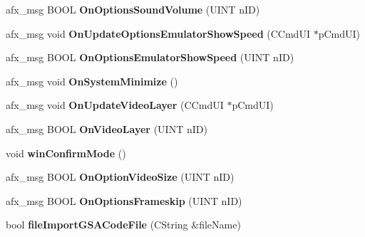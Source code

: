\begin{DoxyCompactItemize}
\item 
\mbox{\label{class_main_wnd_ae784df9d960de0aed023ebfdd444e979}} 
afx\+\_\+msg B\+O\+OL {\bfseries On\+Options\+Sound\+Volume} (U\+I\+NT n\+ID)
\item 
\mbox{\label{class_main_wnd_accdf36d9ca8700e9e49ecd1432de6c11}} 
afx\+\_\+msg void {\bfseries On\+Update\+Options\+Emulator\+Show\+Speed} (C\+Cmd\+UI $\ast$p\+Cmd\+UI)
\item 
\mbox{\label{class_main_wnd_a5f538c28cfe7007a8dd651215f6e4768}} 
afx\+\_\+msg B\+O\+OL {\bfseries On\+Options\+Emulator\+Show\+Speed} (U\+I\+NT n\+ID)
\item 
\mbox{\label{class_main_wnd_a0fe0ca31c45bc8041267a67eabb9f28e}} 
afx\+\_\+msg void {\bfseries On\+System\+Minimize} ()
\item 
\mbox{\label{class_main_wnd_a559482a80b53127046816f476257cbc7}} 
afx\+\_\+msg void {\bfseries On\+Update\+Video\+Layer} (C\+Cmd\+UI $\ast$p\+Cmd\+UI)
\item 
\mbox{\label{class_main_wnd_aba2fc4c22ea3cbda1187a08a85eeebbe}} 
afx\+\_\+msg B\+O\+OL {\bfseries On\+Video\+Layer} (U\+I\+NT n\+ID)
\item 
\mbox{\label{class_main_wnd_ac2dd4c52f72943279a8d8338edc06343}} 
void {\bfseries win\+Confirm\+Mode} ()
\item 
\mbox{\label{class_main_wnd_a3db1b6ad5af63ac2c3476868c015f6aa}} 
afx\+\_\+msg B\+O\+OL {\bfseries On\+Option\+Video\+Size} (U\+I\+NT n\+ID)
\item 
\mbox{\label{class_main_wnd_a753174cb5893b2a20c004f9431d1f7aa}} 
afx\+\_\+msg B\+O\+OL {\bfseries On\+Options\+Frameskip} (U\+I\+NT n\+ID)
\item 
\mbox{\label{class_main_wnd_af376f9dd20c49c2b0543102e321ea79c}} 
bool {\bfseries file\+Import\+G\+S\+A\+Code\+File} (C\+String \&file\+Name)
\item 
\mbox{\label{class_main_wnd_a2ce340f4f9cfbb4ec41be6ce2e33ed23}} 

\end{DoxyCompactItemize}
